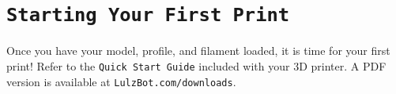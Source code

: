 \section{\texttt{Starting Your First Print}}
Once you have your model, profile, and filament loaded, it is time for your first print! Refer to the \texttt{Quick Start Guide} included with your 3D printer. A PDF version is available at \texttt{LulzBot.com/downloads}.

\begin{comment} %
\subsection{Mini}

Select the \texttt{Print/Control} option in the top left hand corner of your build volume. This will bring up your Pronterface user interface. Please wait for the window to state \texttt{operational} before sending any commands to the printer.

\begin{figure}[hbt]
\centering
\texttt{[image: print\_control.png]}
\caption{Print Control Screen}
\label{fig:Print Control}
\end{figure}

\subsection{\texttt{Pausing Mid-Print}}
\index{pausing the printing process}
\index{pause print}
You will notice after you click the print button through Cura, it will change to a pause button. When activated, it will pause the print and automatically move your print head away from your object. This will allow color changes or material changes mid print.

\subsection{\texttt{Automatic Bed Leveling}}
\index{automatic bed leveling}
\index{ABL}
Before each print your Mini will go through a wiping and a probing procedure in order to determine the slope/tilt of your bed. If your nozzle is dirty or not cleaned properly, this will prevent the printer from being able to create an electrical contact with the corners. Your Mini will automatically retry the wiping and probing procedure if this happens, up to a maximum of three times. If three consecutive wipes and probes have failed, the printer will stop and a warning will sound. If this is happening consistently, you should replace the wiping pad and/or adjust your wiping and probing temps for that specific filament. See section \ref{sssec:num1} on page \pageref{sssec:num1} for details on changing these temps.


\end{comment}
